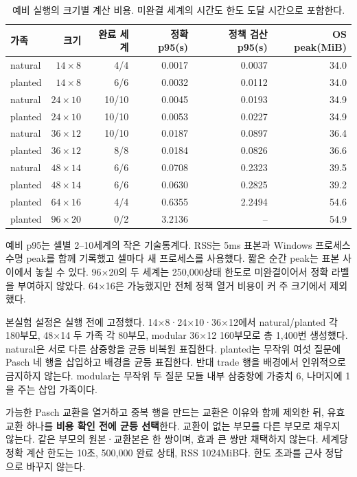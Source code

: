 \documentclass[11pt,a4paper]{article}
\theoremstyle{definition}
\theoremstyle{remark}\newtheorem{remark}[theorem]{주석}
\begin{document}
\begin{table}[htbp]
\centering\small
\caption{예비 실행의 크기별 계산 비용. 미완결 세계의 시간도 한도 도달 시간으로 포함한다.}\label{tab:pilot}
\begin{tabular}{lrrrrr}\toprule
가족 & 크기 & 완료 세계 & 정확 p95(s) & 정책 검산 p95(s) & OS peak(MiB)\\\midrule
natural & $14\times8$ & 4/4 & 0.0017 & 0.0037 & 34.0\\
planted & $14\times8$ & 6/6 & 0.0032 & 0.0112 & 34.0\\
natural & $24\times10$ & 10/10 & 0.0045 & 0.0193 & 34.9\\
planted & $24\times10$ & 10/10 & 0.0053 & 0.0227 & 34.9\\
natural & $36\times12$ & 10/10 & 0.0187 & 0.0897 & 36.4\\
planted & $36\times12$ & 8/8 & 0.0184 & 0.0826 & 36.6\\
natural & $48\times14$ & 6/6 & 0.0708 & 0.2323 & 39.5\\
planted & $48\times14$ & 6/6 & 0.0630 & 0.2825 & 39.2\\
planted & $64\times16$ & 4/4 & 0.6355 & 2.2494 & 54.6\\
planted & $96\times20$ & 0/2 & 3.2136 & -- & 54.9\\
\bottomrule\end{tabular}

\end{table}

예비 p95는 셀별 2--10세계의 작은 기술통계다. RSS는 5ms 표본과 Windows 프로세스 수명 peak를 함께 기록했고 셀마다 새 프로세스를 사용했다. 짧은 순간 peak는 표본 사이에서 놓칠 수 있다. 96×20의 두 세계는 250,000상태 한도로 미완결이어서 정확 라벨을 부여하지 않았다. 64×16은 가능했지만 전체 정책 열거 비용이 커 주 크기에서 제외했다.

본실험 설정은 실행 전에 고정했다. 14×8·24×10·36×12에서 natural/planted 각 180부모, 48×14 두 가족 각 80부모, modular 36×12 160부모로 총 1,400번 생성했다. natural은 서로 다른 삼중항을 균등 비복원 표집한다. planted는 무작위 여섯 질문에 Pasch 네 행을 삽입하고 배경을 균등 표집한다. 반대 trade 행을 배경에서 인위적으로 금지하지 않는다. modular는 무작위 두 질문 모듈 내부 삼중항에 가중치 6, 나머지에 1을 주는 삽입 가족이다.

가능한 Pasch 교환을 열거하고 중복 행을 만드는 교환은 이유와 함께 제외한 뒤, 유효 교환 하나를 \textbf{비용 확인 전에 균등 선택}한다. 교환이 없는 부모를 다른 부모로 채우지 않는다. 같은 부모의 원본·교환본은 한 쌍이며, 효과 큰 쌍만 채택하지 않는다. 세계당 정확 계산 한도는 10초, 500,000 완료 상태, RSS 1024MiB다. 한도 초과를 근사 정답으로 바꾸지 않는다.
\end{document}
